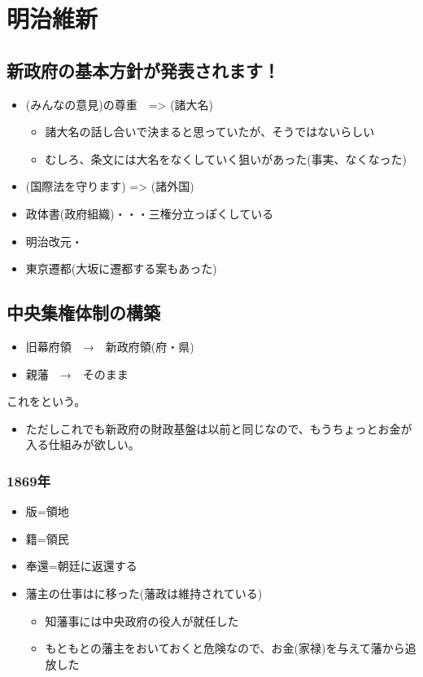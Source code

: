 \documentclass[12pt,fleqn]{ltjsarticle}
\begin{document}
\section{明治維新}
\subsection{新政府の基本方針が発表されます！}

\begin{itemize}
\item {} (みんなの意見)の尊重　=> (諸大名)
\begin{itemize}
\item 諸大名の話し合いで決まると思っていたが、そうではないらしい
\item むしろ、条文には大名をなくしていく狙いがあった(事実、なくなった)
\end{itemize}
 \item {} (国際法を守ります) => (諸外国)
\item 政体書(政府組織)・・・三権分立っぽくしている
\item 明治改元・
\item 東京遷都(大坂に遷都する案もあった)
\end{itemize}

\subsection{中央集権体制の構築}
\begin{itemize}
\item 旧幕府領　→　新政府領(府・県)
\item 親藩　→　そのまま
\end{itemize}
これをという。
\begin{itemize}
\item ただしこれでも新政府の財政基盤は以前と同じなので、もうちょっとお金が入る仕組みが欲しい。
\end{itemize}
\subsubsection*{1869年 }
\begin{itemize}
\item 版=領地
\item 籍=領民
\item 奉還=朝廷に返還する
\item 藩主の仕事はに移った(藩政は維持されている)
\begin{itemize}
\item 知藩事には中央政府の役人が就任した
\item もともとの藩主をおいておくと危険なので、お金(家禄)を与えて藩から追放した
\end{itemize}
\end{itemize}
\end{document}
